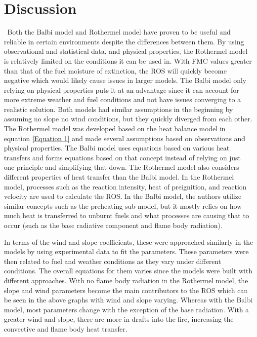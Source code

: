 \documentclass{article}
\begin{document}
\section{Discussion}

 Both the Balbi model and Rothermel model have proven to be useful and reliable in certain environments despite the differences between them. By using observational and statistical data, and physical properties, the Rothermel model is relatively limited on the conditions it can be used in. With FMC values greater than that of the fuel moisture of extinction, the ROS will quickly become negative which would likely cause issues in larger models. The Balbi model only relying on physical properties puts it at an advantage since it can account for more extreme weather and fuel conditions and not have issues converging to a realistic solution. Both models had similar assumptions in the beginning by assuming no slope no wind conditions, but they quickly diverged from each other. The Rothermel model was developed based on the heat balance model in equation \ref{Equation 1} and made several assumptions based on observations and physical properties. The Balbi model uses equations based on various heat transfers and forms equations based on that concept instead of relying on just one principle and simplifying that down. The Rothermel model also considers different properties of heat transfer than the Balbi model. In the Rothermel model, processes such as the reaction intensity, heat of preignition, and reaction velocity are used to calculate the ROS. In the Balbi model, the authors utilize similar concepts such as the preheating sub model, but it mostly relies on how much heat is transferred to unburnt fuels and what processes are causing that to occur (such as the base radiative component and flame body radiation). 

In terms of the wind and slope coefficients, these were approached similarly in the models by using experimental data to fit the parameters. These parameters were then related to fuel and weather conditions as they vary under different conditions. The overall equations for them varies since the models were built with different approaches. With no flame body radiation in the Rothermel model, the slope and wind parameters become the main contributors to the ROS which can be seen in the above graphs with wind and slope varying. Whereas with the Balbi model, most parameters change with the exception of the base radiation. With a greater wind and slope, there are more in drafts into the fire, increasing the convective and flame body heat transfer. 
\end{document}
